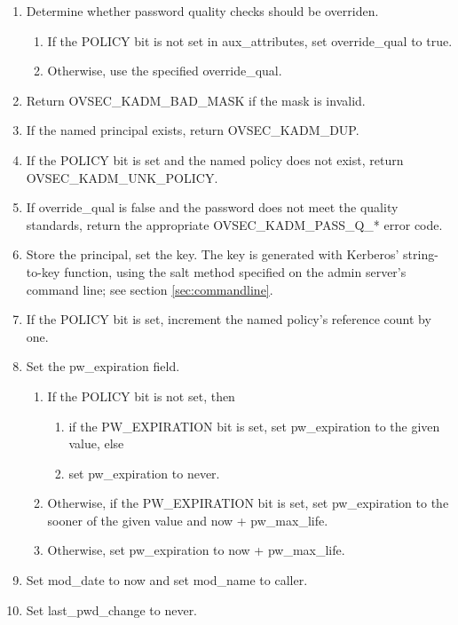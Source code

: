 \begin{enumerate}
\item Determine whether password quality checks should be overriden.
\begin{enumerate}
\item If the POLICY bit is not set in aux_attributes, set
override_qual to true.
\item Otherwise, use the specified override_qual.
\end{enumerate}

\item Return OVSEC_KADM_BAD_MASK if the mask is invalid.
\item If the named principal exists, return OVSEC_KADM_DUP.
\item If the POLICY bit is set and the named policy does not exist,
return OVSEC_KADM_UNK_POLICY.
\item If override_qual is false and the password does not meet the
quality standards, return the appropriate OVSEC_KADM_PASS_Q_* error
code.
\item Store the principal, set the key.  The key is generated with
Kerberos' string-to-key function, using the salt method specified on
the admin server's command line; see section \ref{sec:commandline}.
\item If the POLICY bit is set, increment the named policy's reference
count by one.

\item Set the pw_expiration field.
\begin{enumerate}
\item If the POLICY bit is not set, then
\begin{enumerate}
\item if the PW_EXPIRATION bit is set, set pw_expiration to the given
value, else
\item set pw_expiration to never.
\end{enumerate}
\item Otherwise, if the PW_EXPIRATION bit is set, set pw_expiration to
the sooner of the given value and now + pw_max_life.
\item Otherwise, set pw_expiration to now + pw_max_life.
\end{enumerate}

\item Set mod_date to now and set mod_name to caller.
\item Set last_pwd_change to never.
\end{enumerate}

